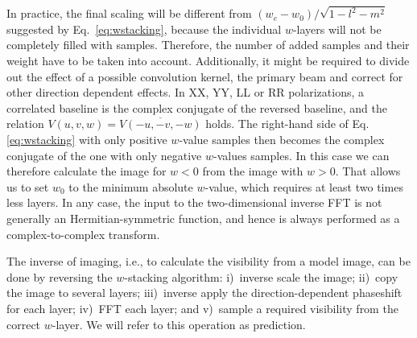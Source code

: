 \documentclass[useAMS,usenatbib]{mn2e}
\begin{document}
In practice, the final scaling will be different from $\left(w_e - w_0\right)/\sqrt{1-l^2-m^2}$ suggested by Eq.~\eqref{eq:wstacking}, because the individual $w$-layers will not be completely filled with samples. Therefore, the number of added samples and their weight have to be taken into account. Additionally, it might be required to divide out the effect of a possible convolution kernel, the primary beam and correct for other direction dependent effects. In XX, YY, LL or RR polarizations, a correlated baseline is the complex conjugate of the reversed baseline, and the relation $V(u,v,w)=\overline{V(-u,-v,-w)}$ holds. The right-hand side of Eq.\eqref{eq:wstacking} with only positive $w$-value samples then becomes the complex conjugate of the one with only negative $w$-values samples. In this case we can therefore calculate the image for $w<0$ from the image with $w>0$. That allows us to set $w_0$ to the minimum absolute $w$-value, which requires at least two times less layers. In any case, the input to the two-dimensional inverse FFT is not generally an Hermitian-symmetric function, and hence is always performed as a complex-to-complex transform. 

The inverse of imaging, i.e., to calculate the visibility from a model image, can be done by reversing the $w$-stacking algorithm: i)~inverse scale the image; ii)~copy the image to several layers; iii)~inverse apply the direction-dependent phaseshift for each layer; iv)~FFT each layer; and v)~sample a required visibility from the correct $w$-layer. We will refer to this operation as prediction.
\end{document}
